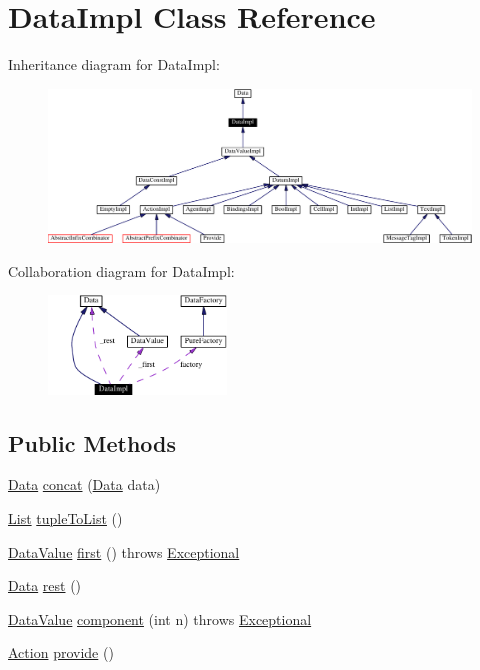 \hypertarget{classDataImpl}{
\section{Data\-Impl  Class Reference}
\label{classDataImpl}
}
Inheritance diagram for Data\-Impl:\begin{figure}[H]
\begin{center}
\leavevmode
\includegraphics[width=381pt]{classDataImpl__inherit__graph}
\end{center}
\end{figure}
Collaboration diagram for Data\-Impl:\begin{figure}[H]
\begin{center}
\leavevmode
\includegraphics[width=134pt]{classDataImpl__coll__graph}
\end{center}
\end{figure}
\subsection*{Public Methods}
\begin{CompactItemize}
\item 
\hyperlink{interfaceData}{Data} \hyperlink{classDataImpl_a0}{concat} (\hyperlink{interfaceData}{Data} data)
\item 
\hyperlink{interfaceList}{List} \hyperlink{classDataImpl_a1}{tuple\-To\-List} ()
\item 
\hyperlink{interfaceDataValue}{Data\-Value} \hyperlink{classDataImpl_a2}{first} () throws \hyperlink{classExceptional}{Exceptional}
\item 
\hyperlink{interfaceData}{Data} \hyperlink{classDataImpl_a3}{rest} ()
\item 
\hyperlink{interfaceDataValue}{Data\-Value} \hyperlink{classDataImpl_a4}{component} (int n) throws \hyperlink{classExceptional}{Exceptional}
\item 
\hyperlink{interfaceAction}{Action} \hyperlink{classDataImpl_a5}{provide} ()
\end{CompactItemize}
